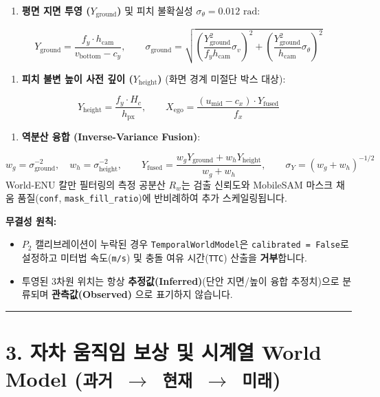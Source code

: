 \documentclass[10.5pt,a4paper]{article}
\begin{document}
\begin{enumerate}[leftmargin=1.8em,itemsep=2pt]
\item \textbf{평면 지면 투영 ($Y_{\text{ground}}$)} 및 피치 불확실성 $\sigma_\theta = 0.012\text{ rad}$:
\end{enumerate}
\[Y_{\text{ground}} = \frac{f_y \cdot h_{\text{cam}}}{v_{\text{bottom}} - c_y}, \qquad \sigma_{\text{ground}} = \sqrt{\left(\frac{Y_{\text{ground}}^2}{f_y h_{\text{cam}}}\sigma_v\right)^2 + \left(\frac{Y_{\text{ground}}^2}{h_{\text{cam}}}\sigma_\theta\right)^2}\]
\begin{enumerate}[leftmargin=1.8em,itemsep=2pt]
\item \textbf{피치 불변 높이 사전 깊이 ($Y_{\text{height}}$)} (화면 경계 미절단 박스 대상):
\end{enumerate}
\[Y_{\text{height}} = \frac{f_y \cdot H_c}{h_{\text{px}}}, \qquad X_{\text{ego}} = \frac{(u_{\text{mid}} - c_x) \cdot Y_{\text{fused}}}{f_x}\]
\begin{enumerate}[leftmargin=1.8em,itemsep=2pt]
\item \textbf{역분산 융합 (Inverse-Variance Fusion)}:
\end{enumerate}
\[w_g = \sigma_{\text{ground}}^{-2}, \quad w_h = \sigma_{\text{height}}^{-2}, \qquad Y_{\text{fused}} = \frac{w_g Y_{\text{ground}} + w_h Y_{\text{height}}}{w_g + w_h}, \qquad \sigma_Y = (w_g + w_h)^{-1/2}\]
World-ENU 칼만 필터링의 측정 공분산 $R_w$는 검출 신뢰도와 MobileSAM 마스크 채움 품질(\texttt{conf}, \texttt{mask\_\allowbreak{}fill\_\allowbreak{}ratio})에 반비례하여 추가 스케일링됩니다.


\textbf{무결성 원칙:}

\begin{itemize}[leftmargin=1.5em,itemsep=2pt]
\item $P_2$ 캘리브레이션이 누락된 경우 \texttt{TemporalWorldModel}은 \texttt{calibrated = False}로 설정하고 미터법 속도(\texttt{m/\allowbreak{}s}) 및 충돌 여유 시간(\texttt{TTC}) 산출을 \textbf{거부}합니다.
\item 투영된 3차원 위치는 항상 \textbf{추정값(Inferred)}(단안 지면/높이 융합 추정치)으로 분류되며 \textbf{관측값(Observed)} 으로 표기하지 않습니다.
\end{itemize}

\par\noindent\rule{\textwidth}{0.4pt}\par\medskip

\section{3. 자차 움직임 보상 및 시계열 World Model (\texttt{과거 $\rightarrow$ 현재 $\rightarrow$ 미래})}
\end{document}
